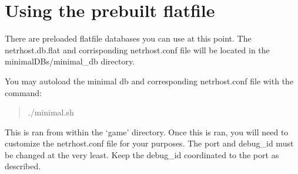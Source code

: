 \documentclass[letterpaper,10pt,english]{sphinxmanual}
\begin{document}
\section{Using the prebuilt flatfile}
\label{\detokenize{24-quickinstall:using-the-prebuilt-flatfile}}
\sphinxAtStartPar
There are pre\sphinxhyphen{}loaded flatfile databases you can use at this point.  The netrhost.db.flat
and corrisponding netrhost.conf file will be located in the minimal\sphinxhyphen{}DBs/minimal\_db directory.

\sphinxAtStartPar
You may auto\sphinxhyphen{}load the minimal db and corresponding netrhost.conf file with the
command:
\begin{quote}

\sphinxAtStartPar
./minimal.sh
\end{quote}

\sphinxAtStartPar
This is ran from within the ‘game’ directory.  Once this is ran, you will need
to customize the netrhost.conf file for your purposes.  The port and debug\_id must
be changed at the very least.  Keep the debug\_id coordinated to the port as described.
\end{document}

